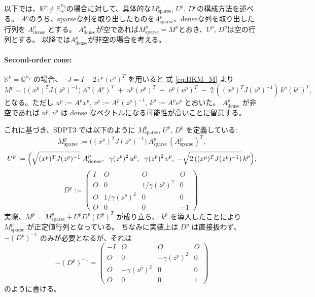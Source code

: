\documentclass{jsarticle}
\begin{document}
\medskip

以下では、$\mathbb{K}^p \neq \mathbb{S}^{n_p}_+$の場合に対して、具体的な$M^p_{\mathrm{sparse}}$, $U^p$, $D^p$の構成方法を述べる。
$A^p$のうち、sparseな列を取り出したものを$A^p_{\mathrm{sparse}}$、denseな列を取り出した行列を $A^p_{\mathrm{dense}}$ とする。
$A^p_{\mathrm{dense}}$が空であれば$M^p_{\mathrm{sparse}} = M^p$とおき、$U^p$, $D^p$は空の行列とする。
以降では$A^p_{\mathrm{dense}}$が非空の場合を考える。

\paragraph{Second-order cone:}

$\mathbb{K}^p=\mathbb{Q}^{n_p}$ の場合、$-J = I - 2\,e^p(e^p)^T$ を用いると
式 \eqref{eq:HKM_M} より
\[
  M^p 
  = \bigl((x^p)^T J (z^p)^{-1}\bigr)\, A^p(A^p)^T
    \;+\; u^p (v^p)^T
    \;+\; v^p (u^p)^T
    \;-\; 2\,((x^p)^T J (z^p)^{-1})\, k^p (k^p)^T,
\]
となる。ただし $u^p := A^p x^p$, $v^p := A^p (z^p)^{-1}$, $k^p := A^p e^p$ とおいた。
$A^p_{\mathrm{dense}}$ が非空であれば $u^p, v^p$ は dense なベクトルになる可能性が高いことに留意する。

これに基づき、SDPT3 では以下のように $M^p_{\mathrm{sparse}}$, $U^p$, $D^p$ を定義している:
\[
  M^p_{\mathrm{sparse}}
    := \bigl((x^p)^T J (z^p)^{-1}\bigr)\,
       A^p_{\mathrm{sparse}}\,(A^p_{\mathrm{sparse}})^T,
\]
\[
  U^p
    := \Bigl(\sqrt{(x^p)^T J (z^p)^{-1}}\;A^p_{\mathrm{dense}},
       \;\;\gamma(z^p)^2\,u^p,\;\;\gamma(z^p)^2\,v^p,
       \;-\sqrt{2\,((x^p)^T J (z^p)^{-1})}\,k^p\Bigr),
\]
\[
  D^p
    := \begin{pmatrix}
         I & O & O & O \\
         O & 0 & 1/\gamma(z^p)^2 & 0 \\
         O & 1/\gamma(z^p)^2 & 0 & 0 \\
         O & 0 & 0 & -1
       \end{pmatrix}.
\]
実際、$M^p = M^p_{\mathrm{sparse}} + U^p D^p (U^p)^T$ が成り立ち、
$k^p$ を導入したことにより $M^p_{\mathrm{sparse}}$ が正定値行列となっている。  
ちなみに実装上は $D^p$ は直接扱わず、$-(D^p)^{-1}$ のみが必要となるが、それは
\[
  -(D^p)^{-1}
  = \begin{pmatrix}
      -I & O & O & O \\
      O & 0 & -\gamma(z^p)^2 & 0 \\
      O & -\gamma(z^p)^2 & 0 & 0 \\
      O & 0 & 0 & 1
    \end{pmatrix}
\]
のように書ける。
\end{document}
